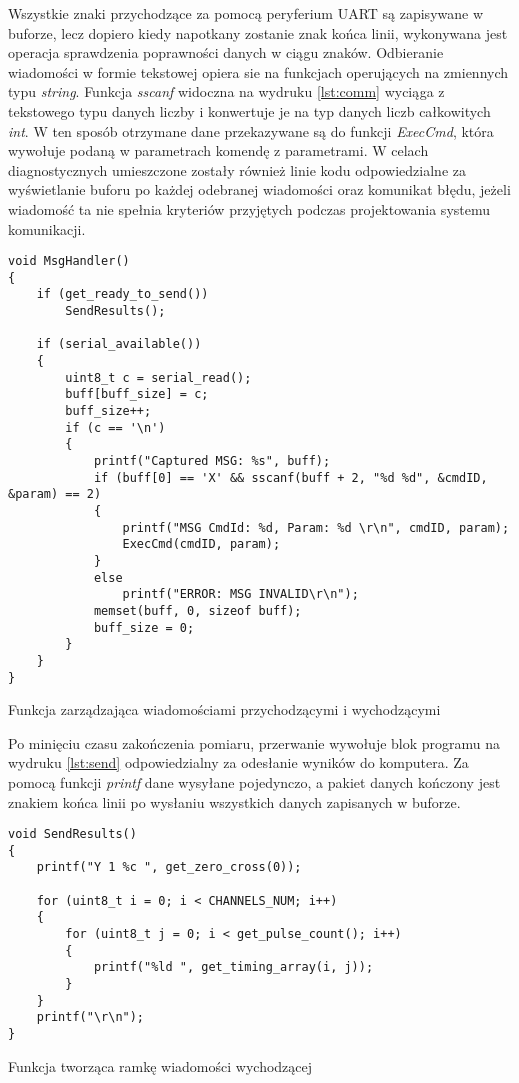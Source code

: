 Wszystkie znaki przychodzące za pomocą peryferium UART są zapisywane w buforze, lecz dopiero kiedy napotkany zostanie znak końca linii, 
wykonywana jest operacja sprawdzenia poprawności danych w ciągu znaków. 
Odbieranie wiadomości w formie tekstowej opiera sie na funkcjach operujących na zmiennych typu \textit{string}. 
Funkcja \textit{sscanf} 
widoczna na wydruku \ref{lst:comm}  wyciąga z tekstowego typu danych liczby i konwertuje je na typ danych liczb całkowitych \textit{int}.
W ten sposób otrzymane dane przekazywane są do funkcji \textit{ExecCmd}, która wywołuje podaną w parametrach komendę z parametrami.
W celach diagnostycznych umieszczone zostały również linie kodu odpowiedzialne za wyświetlanie buforu po każdej odebranej wiadomości oraz komunikat błędu, 
jeżeli wiadomość ta nie spełnia kryteriów przyjętych podczas projektowania systemu komunikacji.

\begin{listing}[tp]
    \begin{verbatim}
void MsgHandler()
{
    if (get_ready_to_send())
        SendResults();

    if (serial_available())
    {
        uint8_t c = serial_read();
        buff[buff_size] = c;
        buff_size++;
        if (c == '\n')
        {
            printf("Captured MSG: %s", buff);
            if (buff[0] == 'X' && sscanf(buff + 2, "%d %d", &cmdID, &param) == 2)
            {
                printf("MSG CmdId: %d, Param: %d \r\n", cmdID, param);
                ExecCmd(cmdID, param);
            }
            else
                printf("ERROR: MSG INVALID\r\n");
            memset(buff, 0, sizeof buff);
            buff_size = 0;
        }
    }
}
    \end{verbatim}
\caption{Funkcja zarządzająca wiadomościami przychodzącymi i wychodzącymi}
\label{lst:comm}
\end{listing}


Po minięciu czasu zakończenia pomiaru, przerwanie wywołuje blok programu na wydruku \ref{lst:send} odpowiedzialny za odesłanie wyników do komputera. Za pomocą funkcji \textit{printf}
dane wysyłane pojedynczo, a pakiet danych kończony jest znakiem końca linii po wysłaniu wszystkich danych zapisanych w buforze.

\begin{listing}[tp]
    \begin{verbatim}
void SendResults()
{
    printf("Y 1 %c ", get_zero_cross(0));

    for (uint8_t i = 0; i < CHANNELS_NUM; i++)
    {
        for (uint8_t j = 0; i < get_pulse_count(); i++)
        {
            printf("%ld ", get_timing_array(i, j));
        }
    }
    printf("\r\n");
}
    \end{verbatim}
\caption{Funkcja tworząca ramkę wiadomości wychodzącej}
\label{lst:send}
\end{listing}

